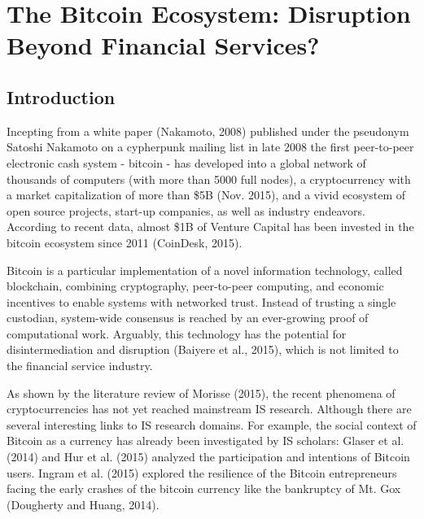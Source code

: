 \chapter{The Bitcoin Ecosystem: Disruption Beyond Financial Services?}

\section{Introduction}

Incepting from a white paper (Nakamoto, 2008) published under the pseudonym Satoshi 
Nakamoto on a cypherpunk mailing list in late 2008 the first peer-to-peer electronic 
cash system - bitcoin - has developed into a global network of thousands of computers 
(with more than 5000 full nodes), a cryptocurrency with a market capitalization 
of more than \$5B (Nov. 2015), and a vivid ecosystem of open source projects, start-up 
companies, as well as industry endeavors. According to recent data, almost \$1B 
of Venture Capital has been invested in the bitcoin ecosystem since 2011 (CoinDesk, 
2015). 

Bitcoin is a particular implementation of a novel information technology, called 
blockchain, combining cryptography, peer-to-peer computing, and economic incentives 
to enable systems with networked trust. Instead of trusting a single custodian, 
system-wide consensus is reached by an ever-growing proof of computational work. 
Arguably, this technology has the potential for disintermediation and disruption 
(Baiyere et al., 2015), which is not limited to the financial service industry. 

As shown by the literature review of Morisse (2015), the recent phenomena of cryptocurrencies 
has not yet reached mainstream IS research. Although there are several interesting 
links to IS research domains. For example, the social context of Bitcoin as a currency 
has already been investigated by IS scholars: Glaser et al. (2014) and Hur et al. 
(2015) analyzed the participation and intentions of Bitcoin users. Ingram et al. 
(2015) explored the resilience of the Bitcoin entrepreneurs facing the early crashes 
of the bitcoin currency like the bankruptcy of Mt. Gox (Dougherty and Huang, 2014). 

